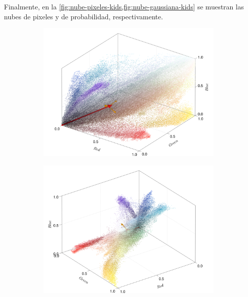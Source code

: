 Finalmente, en la \cref{fig:nube-pixeles-kids,fig:nube-gaussiana-kids} se muestran las nubes de pixeles y de probabilidad, respectivamente.
\begin{figure}[ht!]
    \centering
    \begin{subfigure}[c]{0.3\textwidth}
        \centering
        \includegraphics[scale=0.09]{../figures/pixel_cloud_kids_1}
    \end{subfigure}
    \begin{subfigure}[c]{0.3\textwidth}
        \centering
        \includegraphics[scale=0.09]{../figures/pixel_cloud_kids_2}
    \end{subfigure}
    \begin{subfigure}[c]{0.3\textwidth}

\end{subfigure}
\end{figure}
